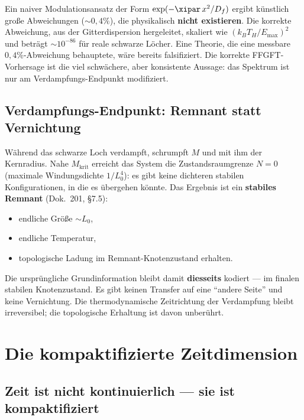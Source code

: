\begin{erkenntnis}
Ein naiver Modulationsansatz der Form $\exp(-\xipar \, x^2 / D_f)$ ergibt künstlich große Abweichungen ($\sim 0{,}4\%$), die physikalisch \textbf{nicht existieren}. Die korrekte Abweichung, aus der Gitterdispersion hergeleitet, skaliert wie $(k_B T_H/E_\text{max})^2$ und beträgt $\sim 10^{-86}$ für reale schwarze Löcher. Eine Theorie, die eine messbare $0{,}4\%$-Abweichung behauptete, wäre bereits falsifiziert. Die korrekte FFGFT-Vorhersage ist die viel schwächere, aber konsistente Aussage: das Spektrum ist nur am Verdampfungs-Endpunkt modifiziert.
\end{erkenntnis}

\subsection{Verdampfungs-Endpunkt: Remnant statt Vernichtung}

Während das schwarze Loch verdampft, schrumpft $M$ und mit ihm der Kernradius. Nahe $M_\text{krit}$ erreicht das System die Zustandsraumgrenze $N = 0$ (maximale Windungsdichte $1/L_0^4$): es gibt keine dichteren stabilen Konfigurationen, in die es übergehen könnte. Das Ergebnis ist ein \textbf{stabiles Remnant} (Dok.~201, §7.5):
\begin{itemize}
  \item endliche Größe $\sim L_0$,
  \item endliche Temperatur,
  \item topologische Ladung im Remnant-Knotenzustand erhalten.
\end{itemize}
Die ursprüngliche Grundinformation bleibt damit \textbf{diesseits} kodiert --- im finalen stabilen Knotenzustand. Es gibt keinen Transfer auf eine ``andere Seite'' und keine Vernichtung. Die thermodynamische Zeitrichtung der Verdampfung bleibt irreversibel; die topologische Erhaltung ist davon unberührt.

\section{Die kompaktifizierte Zeitdimension}

\subsection{Zeit ist nicht kontinuierlich --- sie ist kompaktifiziert}

